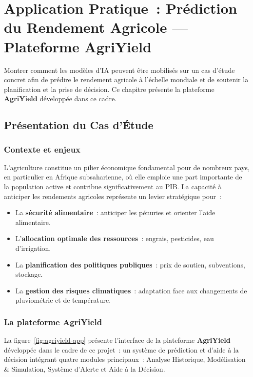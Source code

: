 \chapter{Application Pratique~: Prédiction du Rendement Agricole --- Plateforme AgriYield}

\begin{objectifbox}
Montrer comment les modèles d'IA peuvent être mobilisés sur un cas d'étude concret afin de prédire le rendement agricole à l'échelle mondiale et de soutenir la planification et la prise de décision. Ce chapitre présente la plateforme \textbf{AgriYield} développée dans ce cadre.
\end{objectifbox}

\section{Présentation du Cas d'Étude}

\subsection{Contexte et enjeux}

L'agriculture constitue un pilier économique fondamental pour de nombreux pays, en particulier en Afrique subsaharienne, où elle emploie une part importante de la population active et contribue significativement au PIB. La capacité à anticiper les rendements agricoles représente un levier stratégique pour~:
\begin{itemize}[leftmargin=1.5cm]
  \item La \textbf{sécurité alimentaire}~: anticiper les pénuries et orienter l'aide alimentaire.
  \item L'\textbf{allocation optimale des ressources}~: engrais, pesticides, eau d'irrigation.
  \item La \textbf{planification des politiques publiques}~: prix de soutien, subventions, stockage.
  \item La \textbf{gestion des risques climatiques}~: adaptation face aux changements de pluviométrie et de température.
\end{itemize}

\subsection{La plateforme AgriYield}

La figure~\ref{fig:agriyield-app} présente l'interface de la plateforme \textbf{AgriYield} développée dans le cadre de ce projet~: un système de prédiction et d'aide à la décision intégrant quatre modules principaux~: Analyse Historique, Modélisation \& Simulation, Système d'Alerte et Aide à la Décision.

